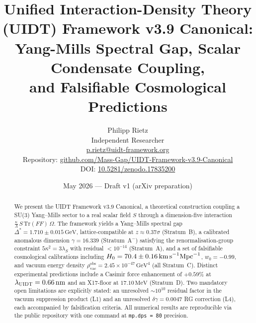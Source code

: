 \documentclass[12pt,a4paper]{article}
\newcommand{\UIDT}{\textsc{UIDT}}
\newcommand{\kap}{\kappa}
\newcommand{\lams}{\lambda_S}
\newcommand{\gam}{\gamma}
\newcommand{\Dstar}{\Delta^*}
\newcommand{\rhobs}{\rho_{\mathrm{vac}}^{\mathrm{obs}}}
\begin{document}
\title{%
  \textbf{Unified Interaction-Density Theory (UIDT) Framework v3.9 Canonical:}\\[6pt]
  Yang-Mills Spectral Gap, Scalar Condensate Coupling,\\[4pt]
  and Falsifiable Cosmological Predictions
}

\author{
  Philipp Rietz\\[4pt]
  \small Independent Researcher\\[2pt]
  \small \href{mailto:p.rietz@uidt-framework.org}{p.rietz@uidt-framework.org}\\[4pt]
  \small Repository: \href{https://github.com/Mass-Gap/UIDT-Framework-v3.9-Canonical}{github.com/Mass-Gap/UIDT-Framework-v3.9-Canonical}\\[2pt]
  \small DOI: \href{https://doi.org/10.5281/zenodo.17835200}{10.5281/zenodo.17835200}
}

\date{May 2026 — Draft v1 (arXiv preparation)}

\maketitle

\begin{abstract}
We present the \UIDT{} Framework v3.9 Canonical, a theoretical construction
coupling a SU(3) Yang--Mills sector to a real scalar field $S$ through
a dimension-five interaction $\frac{\kap}{\Lambda}\,S\,\mathrm{Tr}(FF)\,\Omega$.
The framework yields a Yang--Mills spectral gap
$\Dstar = 1.710 \pm 0.015\,\text{GeV}$, lattice-compatible at $z \approx 0.37\sigma$
(Stratum~B), a calibrated anomalous dimension $\gam = 16.339$ (Stratum~A$^-$)
satisfying the renormalisation-group constraint $5\kap^2 = 3\lams$ with
residual $< 10^{-14}$ (Stratum~A), and a set of falsifiable cosmological
calibrations including $H_0 = 70.4 \pm 0.16\,\text{km\,s}^{-1}\text{Mpc}^{-1}$,
$w_0 = -0.99$, and vacuum energy density
$\rhobs = 2.45 \times 10^{-47}\,\text{GeV}^4$
(all Stratum~C).
Distinct experimental predictions include a Casimir force enhancement
of $+0.59\%$ at $\lambda_{\UIDT} = 0.66\,\text{nm}$ and an X17-floor at
$17.10\,\text{MeV}$ (Stratum~D).
Two mandatory open limitations are explicitly stated:
an unresolved $\sim10^{10}$ residual factor in the vacuum suppression
product (L1) and an unresolved $\delta\gam = 0.0047$ RG correction
(L4), each accompanied by falsification criteria.
All numerical results are reproducible via the public repository
with one command at \texttt{mp.dps\,=\,80} precision.
\end{abstract}
\end{document}
